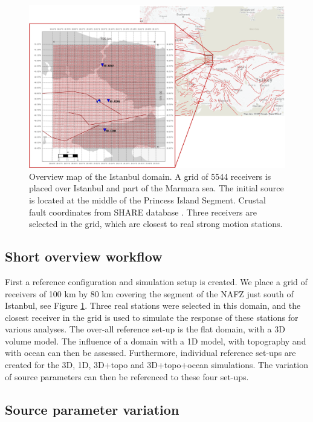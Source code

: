 \documentclass[../Text/00main.tex]{subfiles}
\begin{document}
\begin{figure}
    \centering
    \includegraphics[width=.75\linewidth]{images_methods/Overviewfig_istanbul_domain.png}
    \caption{Overview map of the Istanbul domain. A grid of 5544 receivers is placed over Istanbul and part of the Marmara sea. The initial source is located at the middle of the Princess Island Segment. Crustal fault coordinates from SHARE database \cite{basilic2013european}. Three receivers are selected in the grid, which are closest to real strong motion stations.}
    \label{fig:overviewfig_grid_istanbul}
\end{figure}


\subsection{Short overview workflow}

First a reference configuration and simulation setup is created. We place a grid of receivers of 100 km by 80 km covering the segment of the NAFZ just south of Istanbul, see Figure \ref{fig:overviewfig_grid_istanbul}. Three real stations were selected in this domain, and the closest receiver in the grid is used to simulate the response of these stations for various analyses. The over-all reference set-up is the flat domain, with a 3D volume model. The influence of a domain with a 1D model, with topography and with ocean can then be assessed. Furthermore, individual reference set-ups are created for the 3D, 1D, 3D+topo and 3D+topo+ocean simulations. The variation of source parameters can then be referenced to these four set-ups. 

\subsection{Source parameter variation}
\end{document}
